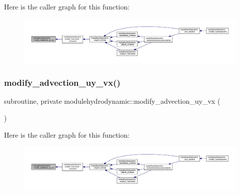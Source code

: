 Here is the caller graph for this function\+:\nopagebreak
\begin{figure}[H]
\begin{center}
\leavevmode
\includegraphics[width=350pt]{namespacemodulehydrodynamic_af43a9493ede9bd9769c3084aeeb523f8_icgraph}
\end{center}
\end{figure}
\mbox{\label{namespacemodulehydrodynamic_ac84a050bb84449fb6c44f7788ee3ff4f}} 
\subsubsection{\texorpdfstring{modify\+\_\+advection\+\_\+uy\+\_\+vx()}{modify\_advection\_uy\_vx()}}
{\footnotesize\ttfamily subroutine, private modulehydrodynamic\+::modify\+\_\+advection\+\_\+uy\+\_\+vx (\begin{DoxyParamCaption}{ }\end{DoxyParamCaption})\hspace{0.3cm}{\ttfamily [private]}}

Here is the caller graph for this function\+:\nopagebreak
\begin{figure}[H]
\begin{center}
\leavevmode
\includegraphics[width=350pt]{namespacemodulehydrodynamic_ac84a050bb84449fb6c44f7788ee3ff4f_icgraph}
\end{center}
\end{figure}
\mbox{\label{namespacemodulehydrodynamic_a8e14732a1f66519f456c093908a3ee4b}} 
